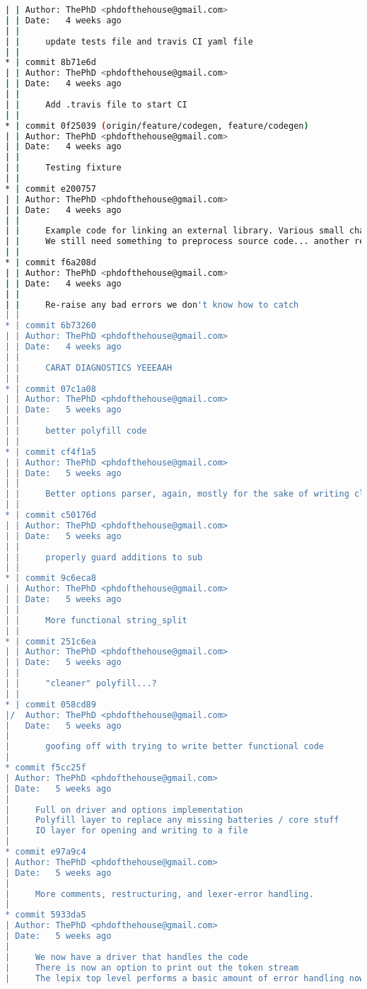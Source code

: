 \begin{lstlisting}[language=bash]
| | Author: ThePhD <phdofthehouse@gmail.com>
| | Date:   4 weeks ago
| | 
| |     update tests file and travis CI yaml file
| |   
* | commit 8b71e6d
| | Author: ThePhD <phdofthehouse@gmail.com>
| | Date:   4 weeks ago
| | 
| |     Add .travis file to start CI
| |   
* | commit 0f25039 (origin/feature/codegen, feature/codegen)
| | Author: ThePhD <phdofthehouse@gmail.com>
| | Date:   4 weeks ago
| | 
| |     Testing fixture
| |   
* | commit e200757
| | Author: ThePhD <phdofthehouse@gmail.com>
| | Date:   4 weeks ago
| | 
| |     Example code for linking an external library. Various small changes to the driver of lepix and the codegen in preparation for the Semantic Analyzer and the AST.
| |     We still need something to preprocess source code... another regular parser, perhaps?
| |   
* | commit f6a208d
| | Author: ThePhD <phdofthehouse@gmail.com>
| | Date:   4 weeks ago
| | 
| |     Re-raise any bad errors we don't know how to catch
| |   
* | commit 6b73260
| | Author: ThePhD <phdofthehouse@gmail.com>
| | Date:   4 weeks ago
| | 
| |     CARAT DIAGNOSTICS YEEEAAH
| |   
* | commit 07c1a08
| | Author: ThePhD <phdofthehouse@gmail.com>
| | Date:   5 weeks ago
| | 
| |     better polyfill code
| |   
* | commit cf4f1a5
| | Author: ThePhD <phdofthehouse@gmail.com>
| | Date:   5 weeks ago
| | 
| |     Better options parser, again, mostly for the sake of writing clearer, better code
| |   
* | commit c50176d
| | Author: ThePhD <phdofthehouse@gmail.com>
| | Date:   5 weeks ago
| | 
| |     properly guard additions to sub
| |   
* | commit 9c6eca8
| | Author: ThePhD <phdofthehouse@gmail.com>
| | Date:   5 weeks ago
| | 
| |     More functional string_split
| |   
* | commit 251c6ea
| | Author: ThePhD <phdofthehouse@gmail.com>
| | Date:   5 weeks ago
| | 
| |     "cleaner" polyfill...?
| |   
* | commit 058cd89
|/  Author: ThePhD <phdofthehouse@gmail.com>
|   Date:   5 weeks ago
|   
|       goofing off with trying to write better functional code
|  
* commit f5cc25f
| Author: ThePhD <phdofthehouse@gmail.com>
| Date:   5 weeks ago
| 
|     Full on driver and options implementation
|     Polyfill layer to replace any missing batteries / core stuff
|     IO layer for opening and writing to a file
|  
* commit e97a9c4
| Author: ThePhD <phdofthehouse@gmail.com>
| Date:   5 weeks ago
| 
|     More comments, restructuring, and lexer-error handling.
|  
* commit 5933da5
| Author: ThePhD <phdofthehouse@gmail.com>
| Date:   5 weeks ago
| 
|     We now have a driver that handles the code
|     There is now an option to print out the token stream
|     The lepix top level performs a basic amount of error handling now

\end{lstlisting}
